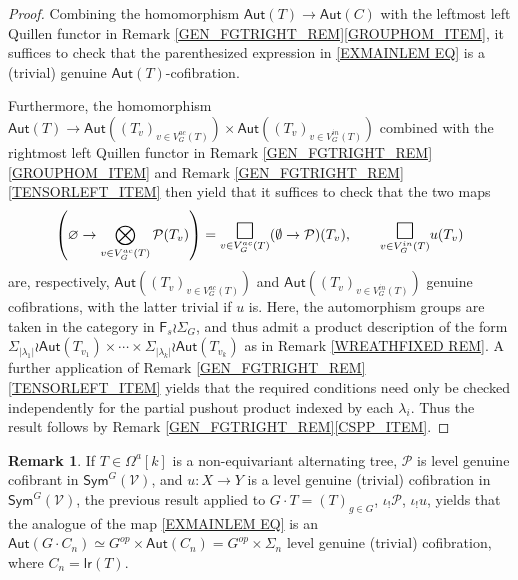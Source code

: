 \documentclass[a4paper,10pt
,draft
]{article}%
\numberwithin{equation}{section}
\numberwithin{figure}{section}
\theoremstyle{definition} %
\newtheorem{remark}[equation]{Remark}%
\newcommand{\Fin}{\mathsf{F}}%
\newcommand{\V}{\ensuremath{\mathcal V}}
\renewcommand{\P}{\ensuremath{\mathcal P}}
\newcommand{\1}{\ensuremath{\mathbbm 1}}%
\begin{document}
\begin{proof}
	Combining the homomorphism $\mathsf{Aut}(T) \to \mathsf{Aut}(C)$ with the leftmost left Quillen functor in 
	Remark \ref{GEN_FGTRIGHT_REM}\ref{GROUPHOM_ITEM},
	it suffices to check that the parenthesized 
	expression in \eqref{EXMAINLEM EQ}
	is a (trivial) genuine 
	$\mathsf{Aut}(T)$-cofibration.

	Furthermore, the homomorphism
	$\mathsf{Aut}(T) \to 
	\mathsf{Aut}\left( (T_v)_{v \in V_G^{ac}(T)}\right) \times 
	\mathsf{Aut}\left( (T_v)_{v \in V_G^{in}(T)}\right)$
	combined with the rightmost left Quillen functor in Remark \ref{GEN_FGTRIGHT_REM}\ref{GROUPHOM_ITEM} and Remark \ref{GEN_FGTRIGHT_REM}\ref{TENSORLEFT_ITEM}
	then yield that it suffices to check that the two maps
\[
\left( \varnothing \to \bigotimes\limits_{v \in V_{G}^{ac}(T)}\P(T_v) \right)
=
\underset{v \in V_{G}^{ac}(T)}{\mathlarger{\mathlarger{\mathlarger{\square}}}}
(\emptyset \to \P)(T_v),
	\qquad
\underset{v \in V_{G}^{in}(T)}{\mathlarger{\mathlarger{\mathlarger{\square}}}}
u(T_v)
\]
are, respectively, 
$\mathsf{Aut}\left( (T_v)_{v \in V_G^{ac}(T)}\right)$ and 
$\mathsf{Aut}\left( (T_v)_{v \in V_G^{in}(T)}\right)$
genuine cofibrations, with the latter trivial if $u$ is. Here, the automorphism groups are taken in the category in $\Fin_s \wr \Sigma_G$,
and thus admit a product description of the form
$
	\Sigma_{|\lambda_1|} \wr 
	\mathsf{Aut}(T_{v_1})
		\times \cdots \times	
	\Sigma_{|\lambda_k|} \wr 
	\mathsf{Aut}(T_{v_k})
$
as in Remark \ref{WREATHFIXED REM}.
A further application of Remark \ref{GEN_FGTRIGHT_REM}\ref{TENSORLEFT_ITEM}
yields that the required conditions need only be checked independently for the
partial pushout product indexed by each $\lambda_i$.
Thus the result follows by Remark \ref{GEN_FGTRIGHT_REM}\ref{CSPP_ITEM}.
\end{proof}



\begin{remark}\label{EXMAINLEM REM}
If %
$T \in \Omega^a[k]$ is a non-equivariant alternating tree, 
$\mathcal{P}$ is level genuine cofibrant in $\mathsf{Sym}^G(\V)$,
and
$u \colon X \to Y$ is a level genuine (trivial) cofibration in $\mathsf{Sym}^G(\V)$,
the previous result applied to
$G \cdot T = (T)_{g \in G}$,
$\iota_{!} \mathcal{P}$,
$\iota_{!} u$,
yields that the analogue of the map
\eqref{EXMAINLEM EQ}
is an $\mathsf{Aut}(G \cdot C_n) 
\simeq G^{op} \times \mathsf{Aut}(C_n) =
G^{op} \times \Sigma_n$ level genuine (trivial) cofibration,
where $C_n = \mathsf{lr}(T)$.
\end{remark}
\end{document}

